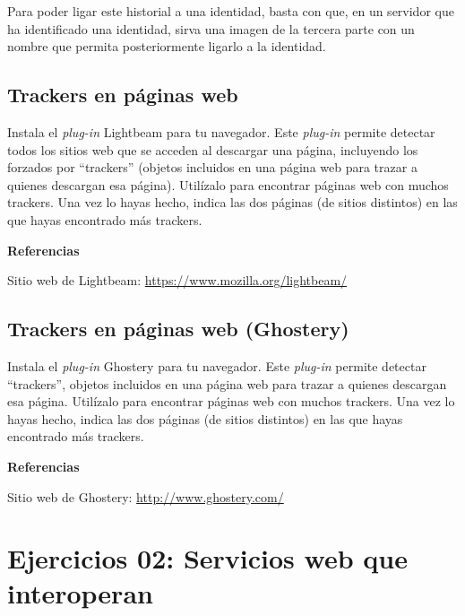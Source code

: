 Para poder ligar este historial a una identidad, basta con que, en un servidor que ha identificado una identidad, sirva una imagen de la tercera parte con un nombre que permita posteriormente ligarlo a la identidad.

\subsection{Trackers en páginas web}
\label{subsec:trackers-paginas-web}

Instala el \emph{plug-in} Lightbeam para tu navegador. Este \emph{plug-in} permite detectar todos los sitios web que se acceden al descargar una página, incluyendo los forzados por ``trackers'' (objetos incluidos en una página web para trazar a quienes descargan esa página). Utilízalo para encontrar páginas web con muchos trackers. Una vez lo hayas hecho, indica las dos páginas (de sitios distintos) en las que hayas encontrado más trackers.

\textbf{Referencias}

Sitio web de Lightbeam: \url{https://www.mozilla.org/lightbeam/}

\subsection{Trackers en páginas web (Ghostery)}
\label{subsec:trackers-paginas-web-2}

Instala el \emph{plug-in} Ghostery para tu navegador. Este \emph{plug-in} permite detectar ``trackers'', objetos incluidos en una página web para trazar a quienes descargan esa página. Utilízalo para encontrar páginas web con muchos trackers. Una vez lo hayas hecho, indica las dos páginas (de sitios distintos) en las que hayas encontrado más trackers.

\textbf{Referencias}

Sitio web de Ghostery: \url{http://www.ghostery.com/}


\section{Ejercicios 02: Servicios web que interoperan}



